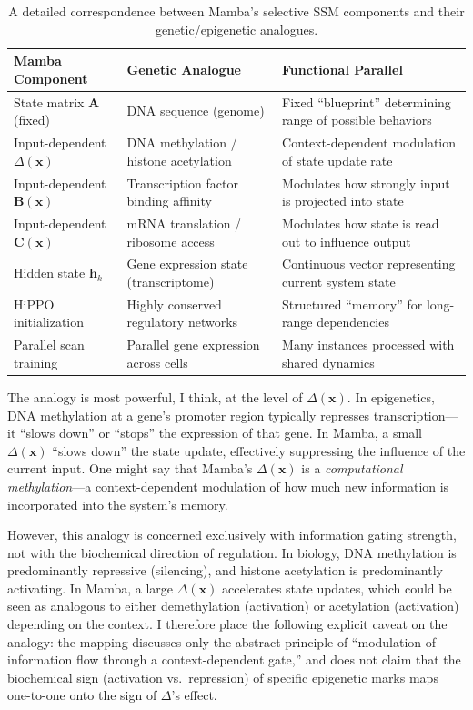 \documentclass[12pt,a4paper]{article}
\renewcommand{\vec}[1]{\mathbf{#1}}
\begin{document}
\begin{table}[htbp]
\centering
\caption{A detailed correspondence between Mamba's selective SSM components and their genetic/epigenetic analogues.}
\label{tab:mamba-epi}
\begin{tabular}{lll}
\toprule
\textbf{Mamba Component} & \textbf{Genetic Analogue} & \textbf{Functional Parallel} \\
\midrule
State matrix $\mathbf{A}$ (fixed) & DNA sequence (genome) & Fixed ``blueprint'' determining range of possible behaviors \\
Input-dependent $\Delta(\vec{x})$ & DNA methylation / histone acetylation & Context-dependent modulation of state update rate \\
Input-dependent $\mathbf{B}(\vec{x})$ & Transcription factor binding affinity & Modulates how strongly input is projected into state \\
Input-dependent $\mathbf{C}(\vec{x})$ & mRNA translation / ribosome access & Modulates how state is read out to influence output \\
Hidden state $\vec{h}_k$ & Gene expression state (transcriptome) & Continuous vector representing current system state \\
HiPPO initialization & Highly conserved regulatory networks & Structured ``memory'' for long-range dependencies \\
Parallel scan training & Parallel gene expression across cells & Many instances processed with shared dynamics \\
\bottomrule
\end{tabular}
\end{table}

The analogy is most powerful, I think, at the level of $\Delta(\vec{x})$. In epigenetics, DNA methylation at a gene's promoter region typically represses transcription---it ``slows down'' or ``stops'' the expression of that gene. In Mamba, a small $\Delta(\vec{x})$ ``slows down'' the state update, effectively suppressing the influence of the current input. One might say that Mamba's $\Delta(\vec{x})$ is a \emph{computational methylation}---a context-dependent modulation of how much new information is incorporated into the system's memory.

However, this analogy is concerned exclusively with information gating strength, not with the biochemical direction of regulation. In biology, DNA methylation is predominantly repressive (silencing), and histone acetylation is predominantly activating. In Mamba, a large $\Delta(\vec{x})$ accelerates state updates, which could be seen as analogous to either demethylation (activation) or acetylation (activation) depending on the context. I therefore place the following explicit caveat on the analogy: the mapping discusses only the abstract principle of ``modulation of information flow through a context-dependent gate,'' and does not claim that the biochemical sign (activation vs.\ repression) of specific epigenetic marks maps one-to-one onto the sign of $\Delta$'s effect.
\end{document}
